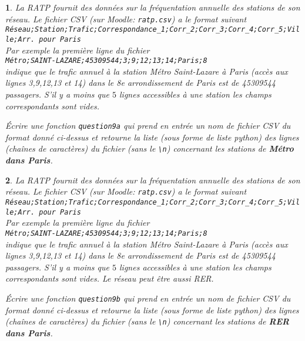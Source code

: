 \documentclass[10pt]{article}
\newtheorem{exi}{}
\newenvironment{exo}{\begin{exi}\em}{\end{exi}}
\begin{document}
\begin{exo}
    La RATP fournit des données sur la fréquentation annuelle des stations de son réseau. Le fichier CSV (sur Moodle: \verb+ratp.csv+) a le format suivant\\
\verb+Réseau;Station;Trafic;Correspondance_1;Corr_2;Corr_3;Corr_4;Corr_5;Ville;Arr. pour Paris+\\
Par exemple la première ligne du fichier\\
\verb+Métro;SAINT-LAZARE;45309544;3;9;12;13;14;Paris;8+\\
indique que le trafic annuel à la station Métro Saint-Lazare à Paris (accès aux lignes 3,9,12,13 et 14) dans le 8e arrondissement de Paris est de 45309544 passagers. S'il y a moins que $5$ lignes accessibles à une station les champs correspondants sont vides.

Écrire une fonction {\tt question9a} qui prend en entrée un nom de fichier CSV
du format donné ci-dessus
et retourne la liste (sous forme de liste python) des lignes (chaînes
de caractères) du fichier (sans le \verb+\n+)
concernant les stations de {\bf Métro dans Paris}.
\end{exo}
\vspace*{-2ex}
\begin{exo}
    La RATP fournit des données sur la fréquentation annuelle des stations de son
réseau. Le fichier CSV (sur Moodle: \verb+ratp.csv+) a le format suivant\\
\verb+Réseau;Station;Trafic;Correspondance_1;Corr_2;Corr_3;Corr_4;Corr_5;Ville;Arr. pour Paris+\\
Par exemple la première ligne du fichier\\
\verb+Métro;SAINT-LAZARE;45309544;3;9;12;13;14;Paris;8+\\
indique que le trafic annuel à la station Métro Saint-Lazare à Paris (accès aux lignes 3,9,12,13 et 14) dans le 8e arrondissement de Paris est de 45309544 passagers.
S'il y a moins que $5$ lignes accessibles à une station les champs correspondants sont vides. Le réseau peut être aussi RER.

Écrire une fonction {\tt question9b} qui prend en entrée un nom de fichier CSV
du format donné ci-dessus
et retourne la liste (sous forme de liste python) des lignes (chaînes
de caractères) du fichier (sans le \verb+\n+)
concernant les stations de {\bf RER dans Paris}.
\end{exo}
\vspace*{-2ex}
\end{document}
